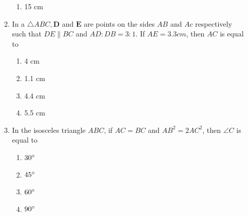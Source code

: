 \documentclass{article}
\let\vec\mathbf
\begin{document}
\begin{enumerate}
\begin{enumerate}
\begin{enumerate}
					\item 15 cm
				\end{enumerate}
			\item In a $ \triangle ABC, \vec{D} $ and $ \vec{E} $ are points on the sides $ AB $ and 
				$ Ac $ respectively such that $ DE \parallel BC $ and $ AD : DB = 3 :1 $. 
				If $ AE = 3.3 cm $, then $ AC $ is equal to
				\begin{enumerate}
					\item 4 cm
					\item 1.1 cm 
					\item 4.4 cm
					\item 5.5 cm
				\end{enumerate}
			\item In the isosceles triangle $ ABC $, if $ AC = BC $ and $ AB^2 = 2AC^2 $, then $ 
				\angle{C} $ is equal to
				\begin{enumerate}
					\item $ 30{\degree} $
					\item $ 45{\degree} $
					\item $ 60{\degree} $
					\item $ 90{\degree} $
				\end{enumerate}
		\end{enumerate}




\end{enumerate}
\end{document}
